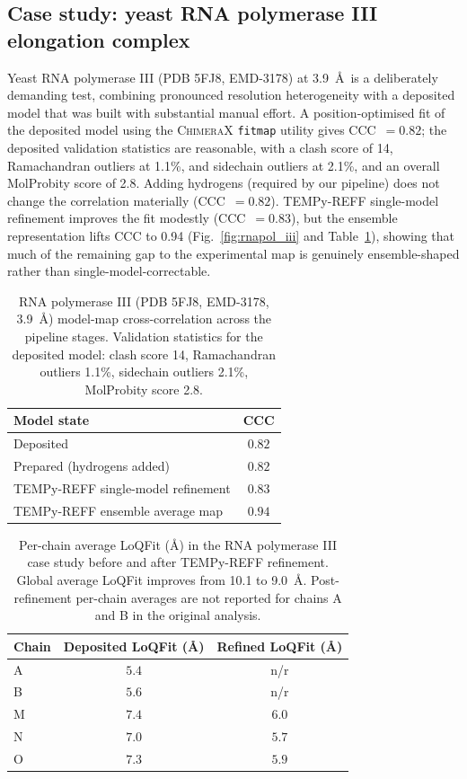 \documentclass[11pt]{article}
\begin{document}
\subsection{Case study: yeast RNA polymerase III elongation complex}
Yeast RNA polymerase III (PDB 5FJ8, EMD-3178) at 3.9~\AA\ is a deliberately demanding test, combining pronounced resolution heterogeneity with a deposited model that was built with substantial manual effort. A position-optimised fit of the deposited model using the \textsc{ChimeraX} \texttt{fitmap} utility gives CCC~$=0.82$; the deposited validation statistics are reasonable, with a clash score of 14, Ramachandran outliers at 1.1\%, and sidechain outliers at 2.1\%, and an overall MolProbity score of 2.8. Adding hydrogens (required by our pipeline) does not change the correlation materially (CCC~$=0.82$). TEMPy-REFF single-model refinement improves the fit modestly (CCC~$=0.83$), but the ensemble representation lifts CCC to 0.94 (Fig.~\ref{fig:rnapol_iii} and Table~\ref{tab:rnapoliii}), showing that much of the remaining gap to the experimental map is genuinely ensemble-shaped rather than single-model-correctable.

\begin{table}[t]
  \centering
  \caption{RNA polymerase III (PDB 5FJ8, EMD-3178, 3.9~\AA) model-map cross-correlation across the pipeline stages. Validation statistics for the deposited model: clash score 14, Ramachandran outliers 1.1\%, sidechain outliers 2.1\%, MolProbity score 2.8.}
  \label{tab:rnapoliii}
  \begin{tabular}{lc}
    \toprule
    Model state & CCC \\
    \midrule
    Deposited & $0.82$ \\
    Prepared (hydrogens added) & $0.82$ \\
    TEMPy-REFF single-model refinement & $0.83$ \\
    TEMPy-REFF ensemble average map & $0.94$ \\
    \bottomrule
  \end{tabular}
\end{table}

\begin{table}[t]
  \centering
  \caption{Per-chain average LoQFit (\AA) in the RNA polymerase III case study before and after TEMPy-REFF refinement. Global average LoQFit improves from 10.1 to 9.0~\AA. Post-refinement per-chain averages are not reported for chains A and B in the original analysis.}
  \label{tab:loqfit}
  \begin{tabular}{lcc}
    \toprule
    Chain & Deposited LoQFit (\AA) & Refined LoQFit (\AA) \\
    \midrule
    A & $5.4$ & n/r \\
    B & $5.6$ & n/r \\
    M & $7.4$ & $6.0$ \\
    N & $7.0$ & $5.7$ \\
    O & $7.3$ & $5.9$ \\
    \bottomrule
  \end{tabular}
\end{table}
\end{document}
